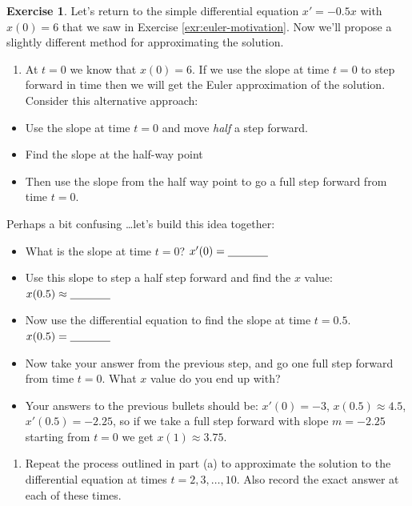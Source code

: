 \documentclass[
]{book}
\providecommand{\tightlist}{%
  \setlength{\itemsep}{0pt}\setlength{\parskip}{0pt}}
\theoremstyle{definition}
\theoremstyle{definition}
\theoremstyle{definition}
\newtheorem{exercise}{Exercise}[chapter]
\theoremstyle{remark}
\begin{document}
\begin{exercise}
\protect\hypertarget{exr:unnamed-chunk-440}{}{\label{exr:unnamed-chunk-440} }Let's return to the simple differential equation \(x' = -0.5x\) with
\(x(0) = 6\) that we saw in Exercise \ref{exr:euler-motivation}. Now we'll propose a slightly different method for approximating the solution.

\begin{enumerate}
\def\labelenumi{\alph{enumi}.}
\tightlist
\item
  At \(t=0\) we know that \(x(0)=6\). If we use the slope at time \(t=0\) to step forward in time then we will get the Euler approximation of the solution. Consider this alternative approach:
\end{enumerate}

\begin{itemize}
\tightlist
\item
  Use the slope at time \(t=0\) and move \emph{half} a step forward.
\item
  Find the slope at the half-way point
\item
  Then use the slope from the half way point to go a full step forward from time \(t=0\).
\end{itemize}

Perhaps a bit confusing \ldots let's build this idea together:

\begin{itemize}
\tightlist
\item
  What is the slope at time \(t=0\)? \(x'(0) = \underline{\hspace{0.5in}}\)
\item
  Use this slope to step a half step forward and find the \(x\) value: \(x(0.5) \approx \underline{\hspace{0.5in}}\)
\item
  Now use the differential equation to find the slope at time \(t=0.5\). \(x(0.5) = \underline{\hspace{0.5in}}\)
\item
  Now take your answer from the previous step, and go one full step forward from time \(t=0\). What \(x\) value do you end up with?
\item
  Your answers to the previous bullets should be: \(x'(0) = -3\), \(x(0.5) \approx 4.5\), \(x'(0.5) = -2.25\), so if we take a full step forward with slope \(m=-2.25\) starting from \(t=0\) we get \(x(1) \approx 3.75\).
\end{itemize}

\begin{enumerate}
\def\labelenumi{\alph{enumi}.}
\setcounter{enumi}{1}
\tightlist
\item
  Repeat the process outlined in part (a) to approximate the solution to the differential equation at times \(t=2, 3, \ldots, 10\). Also record the exact answer at each of these times.
\end{enumerate}


\end{exercise}
\end{document}
